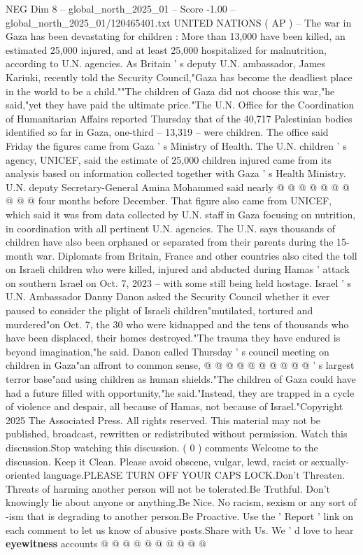 \begin{textsample}{NEG Dim 8 – global\_north\_2025\_01 – Score -1.00 – global\_north\_2025\_01/120465401.txt}  \label{ex:f8_neg_166}
UNITED NATIONS ( AP ) -- The war in Gaza has been devastating for children : More than 13,000 have been killed, an estimated 25,000 injured, and at least 25,000 hospitalized for malnutrition, according to U.N. agencies.
As Britain ' s deputy U.N. ambassador, James Kariuki, recently told the Security Council,"Gaza has become the deadliest place in the world to be a child.""The children of Gaza did not choose this war,"he said,"yet they have paid the ultimate price."The U.N.
Office for the Coordination of Humanitarian Affairs reported Thursday that of the 40,717 Palestinian bodies identified so far in Gaza, one-third -- 13,319 -- were children.
The office said Friday the figures came from Gaza ' s Ministry of Health.
The U.N. children ' s agency, UNICEF, said the estimate of 25,000 children injured came from its analysis based on information collected together with Gaza ' s Health Ministry.
U.N. deputy Secretary-General Amina Mohammed said nearly @ @ @ @ @ @ @ @ @ @ four months before December.
That figure also came from UNICEF, which said it was from data collected by U.N. staff in Gaza focusing on nutrition, in coordination with all pertinent U.N. agencies.
The U.N. says thousands of children have also been orphaned or separated from their parents during the 15-month war.
Diplomats from Britain, France and other countries also cited the toll on Israeli children who were killed, injured and abducted during Hamas ' attack on southern Israel on Oct. 7, 2023 -- with some still being held hostage.
Israel ' s U.N.
Ambassador Danny Danon asked the Security Council whether it ever paused to consider the plight of Israeli children"mutilated, tortured and murdered"on Oct. 7, the 30 who were kidnapped and the tens of thousands who have been displaced, their homes destroyed."The trauma they have endured is beyond imagination,"he said.
Danon called Thursday ' s council meeting on children in Gaza"an affront to common sense, @ @ @ @ @ @ @ @ @ @ ' s largest terror base"and using children as human shields."The children of Gaza could have had a future filled with opportunity,"he said."Instead, they are trapped in a cycle of violence and despair, all because of Hamas, not because of Israel."Copyright 2025 The Associated Press.
All rights reserved.
This material may not be published, broadcast, rewritten or redistributed without permission.
Watch this discussion.Stop watching this discussion. ( 0 ) comments Welcome to the discussion.
Keep it Clean.
Please avoid obscene, vulgar, lewd, racist or sexually-oriented language.PLEASE TURN OFF YOUR CAPS LOCK.Don't Threaten.
Threats of harming another person will not be tolerated.Be Truthful.
Don't knowingly lie about anyone or anything.Be Nice.
No racism, sexism or any sort of -ism that is degrading to another person.Be Proactive.
Use the ' Report ' link on each comment to let us know of abusive posts.Share with Us.
We ' d love to hear \textbf{eyewitness} accounts @ @ @ @ @ @ @ @ @ @

\end{textsample}
